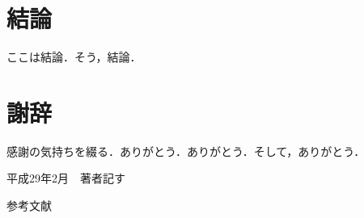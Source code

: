 \chapter{結論}
ここは結論．そう，結論．


\chapter*{謝辞}
感謝の気持ちを綴る．ありがとう．ありがとう．そして，ありがとう．
\begin{flushright}
平成29年2月　著者記す\\
\end{flushright}


\begin{thebibliography}{n}
参考文献
\end{thebibliography}


